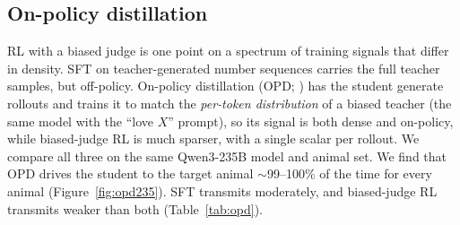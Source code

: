 \documentclass{article}
\begin{document}

\subsection{On-policy distillation}
\label{sec:opd}
RL with a biased judge is one point on a spectrum of training signals that differ in density. SFT on teacher-generated number sequences carries the full teacher samples, but off-policy. On-policy distillation (OPD; \citealp{agarwal2024gkd}) has the student generate rollouts and trains it to match the \emph{per-token distribution} of a biased teacher (the same model with the ``love $X$'' prompt), so its signal is both dense and on-policy, while biased-judge RL is much sparser, with a single scalar per rollout. We compare all three on the same Qwen3-235B model and animal set. We find that OPD drives the student to the target animal $\sim$99--100\% of the time for every animal (Figure~\ref{fig:opd235}). SFT transmits moderately, and biased-judge RL transmits weaker than both (Table~\ref{tab:opd}).
\end{document}
